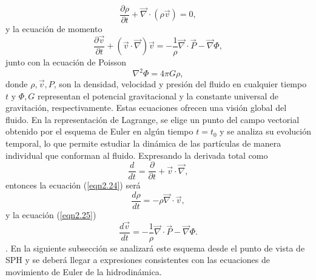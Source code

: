 \documentclass[a4paper,openright,10pt, oneside, final]{book}
\begin{document}
\begin{equation}
 \frac{\partial\rho}{\partial t}
 +
 \vec{\nabla}\cdot(\rho\vec{v})
 = 0,\label{eqn2.24}
\end{equation}
y la ecuación de momento
\begin{equation}
 \frac{\partial\vec{v}}{\partial t}
 +
 (\vec{v}\cdot\vec{\nabla})\vec{v}
 =
 -\frac{1}{\rho} \vec{\nabla}\cdot\vec{P} - \vec{\nabla}\Phi,\label{eqn2.25}
\end{equation}
junto con la ecuación de Poisson
\begin{equation}
 \nabla^{2}\Phi = 4 \pi G \rho,\label{eqn2.26}
\end{equation}
donde $\rho, \vec{v}, P$, son la densidad, velocidad y presión del fluido en cualquier tiempo $t$ y $\Phi, G$ representan el potencial gravitacional y la constante universal de gravitación, respectivamente.
Estas ecuaciones ofrecen una visión global del fluido. En la representación de Lagrange, se elige un punto del campo vectorial obtenido por el esquema de Euler en algún tiempo $t = t_{0}$ y se analiza su evolución temporal, lo que permite estudiar la dinámica de las partículas de manera individual que conforman al fluido. Expresando la derivada total como
\begin{equation}
 \frac{d}{dt}
 =
 \frac{\partial }{\partial t} 
 +
 \vec{v}\cdot\vec{\nabla},\label{eqn2.27}
\end{equation}
entonces la ecuación (\ref{eqn2.24}) será
\begin{equation}
 \frac{d \rho}{d t}
 =
 - \rho \vec{\nabla}\cdot\vec{v},\label{eqn2.28}
\end{equation}
y la ecuación (\ref{eqn2.25})
\begin{equation}
 \frac{d \vec{v}}{d t} 
 =
 -\frac{1}{\rho}\vec{\nabla}\cdot\vec{P} - \vec{\nabla}\Phi.\label{eqn2.29}
\end{equation}.
En la siguiente subsección se analizará este esquema desde el punto de vista de SPH y se deberá llegar a expresiones consistentes con las ecuaciones de movimiento de Euler de la hidrodinámica.
\end{document}
